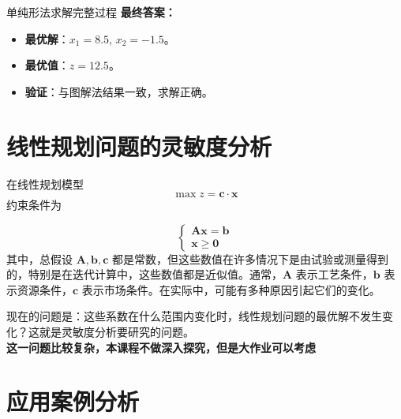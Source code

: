 \begin{exbox}{单纯形法求解完整过程}{}
        \textbf{最终答案：}
        \begin{itemize}
          \item \textbf{最优解}：\( x_1 = 8.5 \), \( x_2 = -1.5 \)。
          \item \textbf{最优值}：\( z = 12.5 \)。  
          \item \textbf{验证}：与图解法结果一致，求解正确。
        \end{itemize}
    \end{exbox}

    \section{线性规划问题的灵敏度分析}
    在线性规划模型
    \[
    \max z = \mathbf{c} \cdot \mathbf{x}
    \]
    约束条件为

    \[
    \left\{
    \begin{array}{l}
    \mathbf{A} \mathbf{x} = \mathbf{b} \\
    \mathbf{x} \geq \mathbf{0}
    \end{array}
    \right.
    \]
    其中，总假设 \( \mathbf{A}, \mathbf{b}, \mathbf{c} \) 都是常数，但这些数值在许多情况下是由试验或测量得到的，特别是在迭代计算中，这些数值都是近似值。通常，\( \mathbf{A} \) 表示工艺条件，\( \mathbf{b} \) 表示资源条件，\( \mathbf{c} \) 表示市场条件。在实际中，可能有多种原因引起它们的变化。

    现在的问题是：这些系数在什么范围内变化时，线性规划问题的最优解不发生变化？这就是灵敏度分析要研究的问题。\\
    \textbf{这一问题比较复杂，本课程不做深入探究，但是大作业可以考虑}



    \section{应用案例分析}
